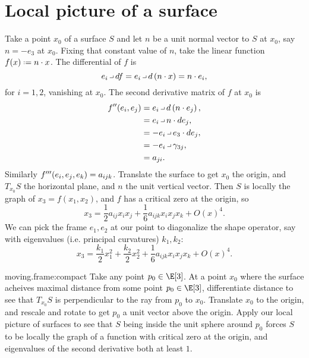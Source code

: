 \section{Local picture of a surface}
Take a point \(x_0\) of a surface \(S\) and let \(n\) be a unit normal vector to \(S\) at \(x_0\), say \(n=-e_3\) at \(x_0\).
Fixing that constant value of \(n\), take the linear function \(f(x) \defeq n\cdot x\).
The differential of \(f\) is
\[
e_i \hook df = e_i \hook d\pr{n \cdot x} = n \cdot e_i,
\]
for \(i=1,2\), vanishing at \(x_0\).
The second derivative matrix of \(f\) at \(x_0\) is
\begin{align*}
f''\of{e_i,e_j}
&=
e_i \hook d\pr{n \cdot e_j},
\\
&=
e_i \hook n \cdot de_j,
\\
&=
-e_i \hook e_3 \cdot de_j,
\\
&=
-e_i \hook \gamma_{3j},
\\
&=
a_{ji}.
\end{align*}
Similarly \(f'''\!\left(e_i,e_j,e_k\right)=a_{ijk}\).
Translate the surface to get \(x_0\) the origin, and \(T_{x_0} S\) the horizontal plane, and \(n\) the unit vertical vector.
Then \(S\) is locally the graph of \(x_3=f(x_1,x_2)\), and \(f\) has a critical zero at the origin, so
\[
x_3=\frac{1}{2}a_{ij}x_ix_j+\frac{1}{6}a_{ijk}x_ix_jx_k+O(x)^4.
\]
We can pick the frame \(e_1,e_2\) at our point to diagonalize the shape operator, say with eigenvalues (i.e. principal curvatures) \(k_1,k_2\):
\[
x_3=\frac{k_1}{2}x_1^2+\frac{k_2}{2}x_2^2+\frac{1}{6}a_{ijk}x_ix_jx_k+O(x)^4.
\]
\begin{answer}{moving.frame:compact}
Take any point \(p_0 \in \E[3]\).
At a point \(x_0\) where the surface acheives maximal distance from some point \(p_0\in\E[3]\), differentiate distance to see that \(T_{x_0} S\)  is perpendicular to the ray from \(p_0\) to \(x_0\).
Translate \(x_0\) to the origin, and rescale and rotate to get \(p_0\) a unit vector above the origin.
Apply our local picture of surfaces to see that \(S\) being inside the unit sphere around \(p_0\) forces \(S\) to be locally the graph of a function with critical zero at the origin, and eigenvalues of the second derivative both at least \(1\).
\end{answer}
